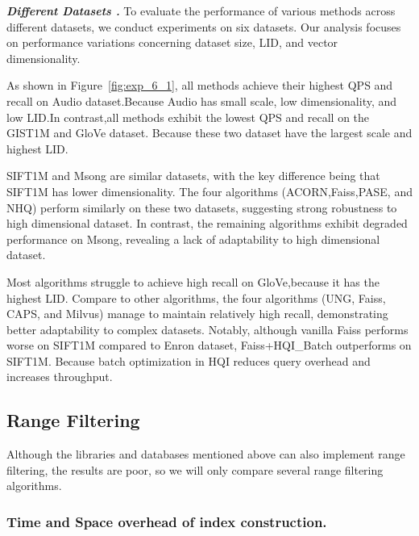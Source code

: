\documentclass[sigconf, nonacm]{acmart}
\begin{document}
\begin{sloppypar}
\textit{\textbf{Different Datasets .}}  
To evaluate the performance of various methods across different datasets, we conduct experiments on six datasets. Our analysis focuses on performance variations concerning dataset size, LID, and vector dimensionality.

As shown in Figure~\ref{fig:exp_6_1}, all methods achieve their highest QPS and recall on Audio dataset.Because Audio has small scale, low dimensionality, and low LID.In contrast,all methods exhibit the lowest QPS and recall on the GIST1M and GloVe dataset. Because these two dataset have the largest scale and highest LID.

SIFT1M and Msong are similar datasets, with the key difference being that SIFT1M has lower dimensionality. The four algorithms (ACORN,Faiss,PASE, and NHQ) perform similarly on these two datasets, suggesting strong robustness to high dimensional dataset. In contrast, the remaining algorithms exhibit degraded performance on Msong, revealing a lack of adaptability to high dimensional dataset.

Most algorithms struggle to achieve high recall on GloVe,because it has the highest LID. Compare to other algorithms, the four algorithms (UNG, Faiss, CAPS, and Milvus) manage to maintain relatively high recall, demonstrating better adaptability to complex datasets. Notably, although vanilla Faiss performs worse on SIFT1M compared to Enron dataset, Faiss+HQI\_Batch outperforms on SIFT1M. Because batch optimization in HQI reduces query overhead and increases throughput.


\subsection{Range Filtering}
Although the libraries and databases mentioned above can also implement range filtering, the results are poor, so we will only compare several range filtering algorithms.
\subsubsection{Time and Space overhead of index construction.}



\end{sloppypar}
\end{document}
